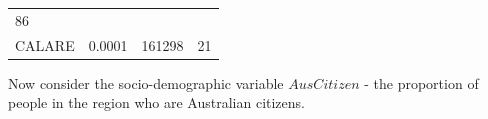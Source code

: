 \documentclass[11pt,a4paper,]{article}
\begin{document}
\begin{longtable}[]{@{}llll@{}}
\begin{minipage}[t]{0.46\columnwidth}
86\strut
\end{minipage}\tabularnewline
\begin{minipage}[t]{0.21\columnwidth}\raggedright
CALARE\strut
\end{minipage} & \begin{minipage}[t]{0.10\columnwidth}\raggedright
0.0001\strut
\end{minipage} & \begin{minipage}[t]{0.11\columnwidth}\raggedright
161298\strut
\end{minipage} & \begin{minipage}[t]{0.46\columnwidth}\raggedright
21\strut
\end{minipage}\tabularnewline
\bottomrule
\end{longtable}

\normalsize

Now consider the socio-demographic variable \(AusCitizen\) - the proportion of people in the region who are Australian citizens.

\footnotesize
\end{document}
